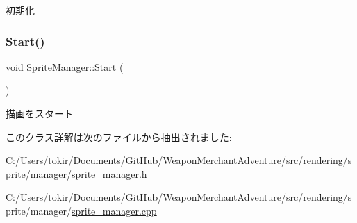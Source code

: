 初期化 

\mbox{\label{class_sprite_manager_a6b387e8736713264f6d590082cd492cb}} 
\subsubsection{\texorpdfstring{Start()}{Start()}}
{\footnotesize\ttfamily void Sprite\+Manager\+::\+Start (\begin{DoxyParamCaption}{ }\end{DoxyParamCaption})\hspace{0.3cm}{\ttfamily [inline]}}



描画をスタート 



このクラス詳解は次のファイルから抽出されました\+:\begin{DoxyCompactItemize}
\item 
C\+:/\+Users/tokir/\+Documents/\+Git\+Hub/\+Weapon\+Merchant\+Adventure/src/rendering/sprite/manager/\mbox{\hyperlink{sprite__manager_8h}{sprite\+\_\+manager.\+h}}\item 
C\+:/\+Users/tokir/\+Documents/\+Git\+Hub/\+Weapon\+Merchant\+Adventure/src/rendering/sprite/manager/\mbox{\hyperlink{sprite__manager_8cpp}{sprite\+\_\+manager.\+cpp}}\end{DoxyCompactItemize}
